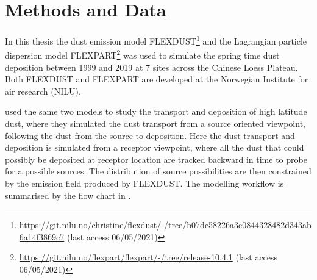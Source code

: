 \chapter{Methods and Data} 
In this thesis the dust emission model 
FLEXDUST\footnote{\url{https://git.nilu.no/christine/flexdust/-/tree/b07dc58226a3e0844328482d343ab6a14f3869c7} (last access 06/05/2021)} 
\parencite{flexdust_ref_2016} and the Lagrangian particle dispersion model 
FLEXPART\footnote{ \url{https://git.nilu.no/flexpart/flexpart/-/tree/release-10.4.1} (last access 06/05/2021)} 
\parencite{Flexpart10.4_ref} was used to 
simulate the spring time dust deposition between 1999 and 2019 at 7 sites across the Chinese Loess Plateau. Both FLEXDUST and FLEXPART are developed at the Norwegian Institute for air research (NILU). 

\textcite{flexdust_ref_2016} used the same two models to study the transport and deposition of high latitude dust, where they simulated the dust transport from a source oriented viewpoint, following the dust from the source to deposition. Here the dust transport and deposition is simulated from a receptor viewpoint, where all the dust that could possibly be deposited at receptor location are tracked backward in time to probe for a possible sources. The distribution of source possibilities are then constrained by the emission field produced by FLEXDUST. The modelling workflow is summarised by the flow chart in . 

